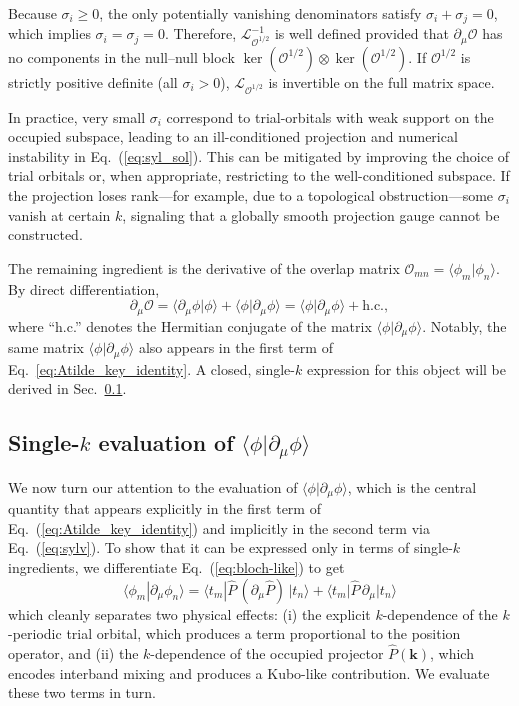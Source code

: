 \documentclass[galley,aps,pra,10pt,amsmath,amssymb,
    superscriptaddress,nofootinbib,longbibliography]{revtex4-2}
\newcounter{comm}
\newcommand{\eq}[1]{Eq.~(\ref{eq:#1})}
\begin{document}
Because $\sigma_i \ge 0$, the only potentially vanishing denominators satisfy $\sigma_i+\sigma_j=0$, which implies $\sigma_i=\sigma_j=0$. Therefore, $\mathcal{L}_{\mathcal{O}^{1/2}}^{-1}$ is well defined provided that $\partial_\mu \mathcal{O}$ has no components in the null--null block $\ker(\mathcal{O}^{1/2}) \otimes \ker(\mathcal{O}^{1/2})$. If $\mathcal{O}^{1/2}$ is strictly positive definite (all $\sigma_i>0$), $\mathcal{L}_{\mathcal{O}^{1/2}}$ is invertible on the full matrix space.

In practice, very small $\sigma_i$ correspond to trial-orbitals with weak support on the occupied subspace, leading to an ill-conditioned projection and numerical instability in \eq{syl_sol}. This can be mitigated by improving the choice of trial orbitals or, when appropriate, restricting to the well-conditioned subspace. If the projection loses rank---for example, due to a topological obstruction---some $\sigma_i$ vanish at certain $k$, signaling that a globally smooth projection gauge cannot be constructed. 

The remaining ingredient is the derivative of the overlap matrix $\mathcal{O}_{mn}=\langle\phi_m|\phi_n\rangle$. By direct differentiation,
\begin{equation}
\label{eq:parmu_O}
\partial_\mu \mathcal{O}
=
\langle \partial_\mu \phi|\phi\rangle
+
\langle \phi|\partial_\mu \phi\rangle
=
\langle \phi|\partial_\mu \phi\rangle + \text{h.c.},
\end{equation}
where ``h.c.'' denotes the Hermitian conjugate of the matrix
$\langle \phi|\partial_\mu \phi\rangle$.
Notably, the same matrix $\langle \phi|\partial_\mu \phi\rangle$
also appears in the first term of Eq.~\eqref{eq:Atilde_key_identity}.
A closed, single-$k$ expression for this object will be derived in Sec.~\ref{sec:eval}.

\subsection{Single-$k$ evaluation of $\langle\phi|\partial_\mu\phi\rangle$}
\label{sec:eval}

We now turn our attention to the evaluation of $\langle\phi|\partial_\mu\phi\rangle$, which is the central quantity that appears explicitly in the first term of \eq{Atilde_key_identity} and implicitly in the second term via \eq{sylv}. To show that it can be expressed only in terms of single-$k$ ingredients, we differentiate \eq{bloch-like} to get
\begin{equation}
\label{eq:phidphi_split}
\langle\phi_m|\partial_\mu\phi_n\rangle
=
\langle t_m|\hat P\,(\partial_\mu \hat P)\,|t_n\rangle
+
\langle t_m|\hat P\,\partial_\mu|t_n\rangle
\end{equation}
which cleanly separates two physical effects: (i) the explicit $k$-dependence of the $k$-periodic trial orbital, which produces a term proportional to the position operator, and (ii) the $k$-dependence of the occupied projector $\hat P(\mathbf{k})$, which encodes interband mixing and produces a Kubo-like contribution. We evaluate these two terms in turn.
\end{document}
